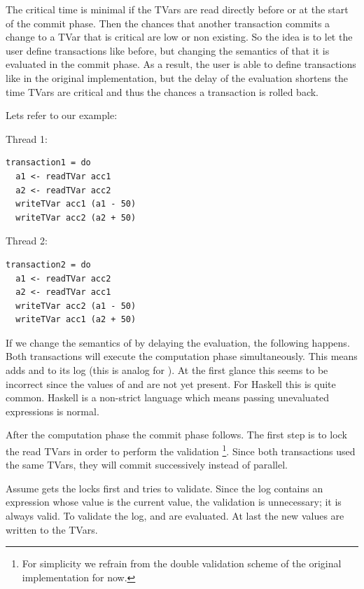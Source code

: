 The critical time is minimal if the TVars are read directly before or at the start of the commit phase.
Then the chances that another transaction commits a change to a TVar that is critical are low or non
existing. So the idea is to let the user define transactions like before, but changing the semantics of 
 that it is evaluated in the commit phase. As a result, the user is able to define transactions like in
the original implementation, but the delay of the evaluation shortens the time TVars are critical and thus
the chances a transaction is rolled back. 

Lets refer to our example: 
\par\noindent
\begin{minipage}[t]{.45\textwidth}
Thread 1:
\begin{lstlisting}[frame=lrtb]
transaction1 = do
  a1 <- readTVar acc1
  a2 <- readTVar acc2
  writeTVar acc1 (a1 - 50)
  writeTVar acc2 (a2 + 50)
\end{lstlisting}
\end{minipage}
\hfill
\begin{minipage}[t]{.45\textwidth}
Thread 2:
\begin{lstlisting}[frame=lrtb]
transaction2 = do 
  a1 <- readTVar acc2
  a2 <- readTVar acc1
  writeTVar acc2 (a1 - 50)
  writeTVar acc1 (a2 + 50)
\end{lstlisting}
\end{minipage}

If we change the semantics of  by delaying the evaluation, the following happens.
Both transactions will execute the computation phase simultaneously. This means  adds
 and  to its log (this is analog for ).
At the first glance this seems to be incorrect since the values of  and  are not yet present.
For Haskell this is quite common. Haskell is a non-strict language which means passing unevaluated expressions
is normal. 

After the computation phase the commit phase follows. The first step is to lock the read TVars in order to 
perform the validation \footnote{For simplicity we refrain from the double validation scheme of the original implementation for now.}. 
Since both transactions used the same TVars, they will commit successively instead of parallel. 

Assume  gets the locks first and tries to validate. 
Since the log contains an expression whose value is the current value, the validation is unnecessary; it is always valid.
To validate the log,  and  are evaluated. At last the new values are written to the TVars.

